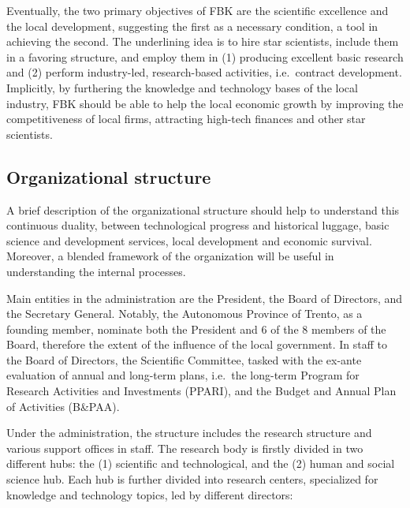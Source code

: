 Eventually, the two primary objectives of FBK are the scientific excellence and the local development, suggesting the first as a necessary condition, a tool in achieving the second. The underlining idea is to hire star scientists, include them in a favoring structure, and employ them in (1) producing excellent basic research and (2) perform industry-led, research-based activities, i.e.\ contract development. Implicitly, by furthering the knowledge and technology bases of the local industry, FBK should be able to help the local economic growth by improving the competitiveness of local firms, attracting high-tech finances and other star scientists.

\subsection{Organizational structure}

A brief description of the organizational structure should help to understand this continuous duality, between technological progress and historical luggage, basic science and development services, local development and economic survival. Moreover, a blended framework of the organization will be useful in understanding the internal processes. 

Main entities in the administration are the President, the Board of Directors, and the Secretary General. Notably, the Autonomous Province of Trento, as a founding member, nominate both the President and 6 of the 8 members of the Board, therefore the extent of the influence of the local government. In staff to the Board of Directors, the Scientific Committee, tasked with the ex-ante evaluation of annual and long-term plans, i.e.\ the long-term Program for Research Activities and Investments (PPARI), and the Budget and Annual Plan of Activities (B\&PAA).

Under the administration, the structure includes the research structure and various support offices in staff. The research body is firstly divided in two different hubs: the (1) scientific and technological, and the (2) human and social science hub. Each hub is further divided into research centers, specialized for knowledge and technology topics, led by different directors:

